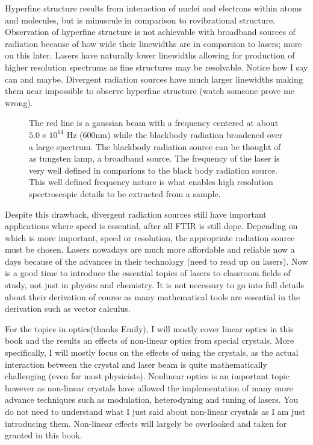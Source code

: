 \documentclass[11pt,a4paper]{book}
\newcommand{\imginput}[1]{} %
\begin{document}
		Hyperfine structure results from interaction of nuclei and electrons within atoms and molecules, but is minuscule in comparison to rovibrational structure. Observation of hyperfine structure is not achievable with broadband sources of radiation because of how wide their linewidths are in comparsion to lasers; more on this later. Lasers have naturally lower linewidths allowing for production of higher resolution spectrums as fine structures may be resolvable. Notice how I say can and maybe. Divergent radiation sources have much larger linewidths making them near impossible to observe hyperfine structure (watch someone prove me wrong). 
		
		\begin{figure} [!ht]
			\centering
			\def\svgwidth{\columnwidth}
			\resizebox{12cm}{!}{\imginput{images/linewidths-gaus-blackbody.pdf_tex}}
			\caption{The red line is a gaussian beam with a frequency centered at about $5.0 \times 10 ^ {14}$ Hz  (600nm) while the blackbody radiation broadened over a large spectrum. The blackbody radiation source can be thought of as tungsten lamp, a broadband source. The frequency of the laser is very well defined in comparions to the black body radiation source. This well defined frequency nature is what enables high resolution spectroscopic details to be extracted from a sample.}
			\label{fig:linewidths-gaus-blackbody}
		\end{figure}
				
		Despite this drawback, divergent radiation sources still have important applications where speed is essential, after all FTIR is still dope. Depending on which is more important, speed or resolution, the appropriate radiation source must be chosen. Lasers nowadays are much more affordable and reliable now a days because of the advances in their technology (need to read up on lasers). Now is a good time to introduce the essential topics of lasers to classroom fields of study, not just in physics and chemistry. It is not necessary to go into full details about their derivation of course as many mathematical tools are essential in the derivation such as vector calculus.
		
		For the topics in optics(thanks Emily), 
		I will mostly cover linear optics in this book and the results an effects of non-linear optics from special crystals. More specifically, I will mostly focus on the effects of using the crystals, as the actual interaction between the crystal and laser beam is quite mathematically challenging (even for most physicists). Nonlinear optics is an important topic however as non-linear crystals have allowed the implementation of many more advance techniques such as modulation, heterodyning and tuning of lasers. You do not need to understand what I just said about non-linear crystals as I am just introducing them. Non-linear effects will largely be overlooked and taken for granted in this book. 
		
\end{document}
